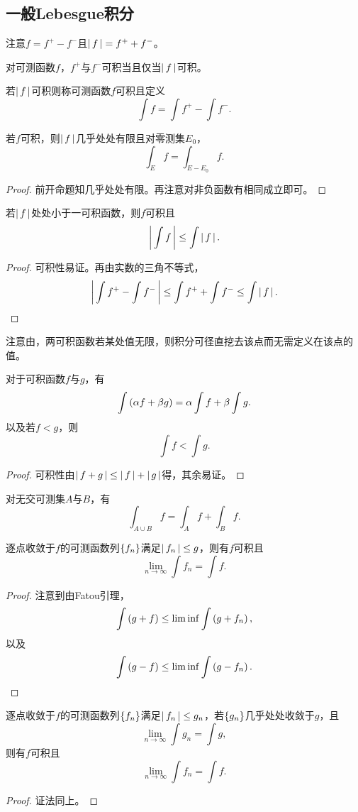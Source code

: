 \documentclass{ctexrep}
\begin{document}
  \subsection{一般Lebesgue积分}
  注意$f=f^+-f^-$且$\left|\, f \,\right| = f^++f^-$。
  \begin{proposition}
    对可测函数$f$，$f^+$与$f^-$可积当且仅当$\left|\, f \,\right|$可积。
  \end{proposition}
  \begin{definition}
    若$\left|\, f \,\right|$可积则称可测函数$f$可积且定义
    \[ \int f = \int f^+ - \int f^-. \]
  \end{definition}
  \begin{proposition}
    \label{prp:Ehole}
    若$f$可积，则$\left|\, f \,\right|$几乎处处有限且对零测集$E_0$，
    \[ \int_E f = \int_{E-E_0} f. \]
  \end{proposition}
  \begin{proof}
    前开命题知几乎处处有限。再注意对非负函数有相同成立即可。
  \end{proof}
  \begin{proposition}[比较审敛法]
    若$\left|\, f \,\right|$处处小于一可积函数，则$f$可积且
    \[ \left|\, \int f \,\right| \le \int \left|\, f \,\right|. \]
  \end{proposition}
  \begin{proof}
    可积性易证。再由实数的三角不等式，
    \[ \left|\, \int f^+ - \int f^- \,\right| \le \int f^+ + \int f^- \le \int \left|\, f \,\right|. \]
  \end{proof}
  注意由，两可积函数若某处值无限，则积分可径直挖去该点而无需定义在该点的值。
  \begin{proposition}[积分的线性与单调性]
    对于可积函数$f$与$g$，有
    \[ \int\left(\alpha f+\beta g\right) = \alpha\int f + \beta\int g. \]
    以及若$f<g$，则
    \[ \int f < \int g. \]
  \end{proposition}
  \begin{proof}
    可积性由$\left|\, f+g \,\right|\le\left|\, f \,\right|+\left|\, g \,\right|$得，其余易证。
  \end{proof}
  \begin{collary}
    对无交可测集$A$与$B$，有
    \[ \int_{A\cup B}f=\int_A f+\int_B f. \]
  \end{collary}
  \begin{theorem}[Lebesgue控制收敛定理]
    逐点收敛于$f$的可测函数列$\left\{f_n\right\}$满足$\left|\, f_n \,\right|\le g$，则有$f$可积且
    \[ \lim_{n\to\infty}\int f_n = \int f. \]
  \end{theorem}
  \begin{proof}
    注意到由Fatou引理，
    \[ \int \left(g+f\right) \le \lim \inf \int \left(g+f_n\right),  \]
    以及
    \[ \int \left(g-f\right) \le \lim \inf \int \left(g-f_n\right). \qedhere \]
  \end{proof}
  \begin{theorem}[一般的Lebesgue控制收敛定理]
    逐点收敛于$f$的可测函数列$\left\{f_n\right\}$满足$\left|\, f_n \,\right|\le g_n$，若$\left\{g_n\right\}$几乎处处收敛于$g$，且
    \[ \lim_{n\to\infty}\int g_n = \int g, \]
    则有$f$可积且
    \[ \lim_{n\to\infty}\int f_n = \int f. \]
  \end{theorem}
  \begin{proof}
    证法同上。
  \end{proof}
\end{document}
